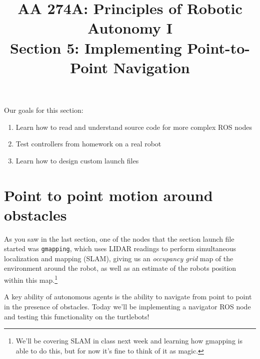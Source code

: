 \documentclass{article}
\title{AA 274A: Principles of Robotic Autonomy I \\Section 5: Implementing Point-to-Point Navigation}
\date{}
\begin{document}
\maketitle
\pagestyle{fancy}
\vspace{-1.25cm}
Our goals for this section: 
\begin{enumerate}
    \item Learn how to read and understand source code for more complex ROS nodes
    \item Test controllers from homework on a real robot
    \item Learn how to design custom launch files
\end{enumerate}

\section{Point to point motion around obstacles}
As you saw in the last section, one of the nodes that the section launch file started was \texttt{gmapping}, which uses LIDAR readings to perform simultaneous localization and mapping (SLAM), giving us an \textit{occupancy grid} map of the environment around the robot, as well as an estimate of the robots position within this map.\footnote{We'll be covering SLAM in class next week and learning how gmapping is able to do this, but for now it's fine to think of it as magic.}

A key ability of autonomous agents is the ability to navigate from point to point in the presence of obstacles. Today we'll be implementing a navigator ROS node and testing this functionality on the turtlebots!


\end{document}
